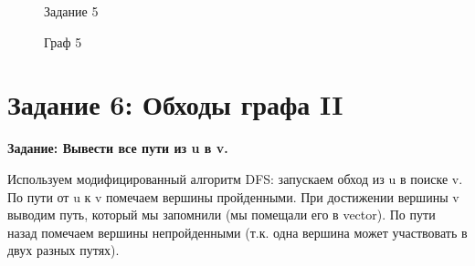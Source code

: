 \documentclass[otchet]{SCWorks}
\begin{document}
\begin{figure}[H]
	\caption{Задание 5}
	\label{pic5_1}
\end{figure}

\begin{figure}[H]
	\caption{Граф 5}
	\label{gr5_1}
\end{figure}

\section{Задание 6: Обходы графа II}

\textbf{Задание: Вывести все пути из u в v.}

Используем модифицированный алгоритм DFS: запускаем обход из u в поиске v. По пути от u к v помечаем вершины пройденными. При достижении вершины v выводим путь, который мы запомнили (мы помещали его в vector). По пути назад помечаем вершины непройденными (т.к. одна вершина может участвовать в двух разных путях).
\end{document}
